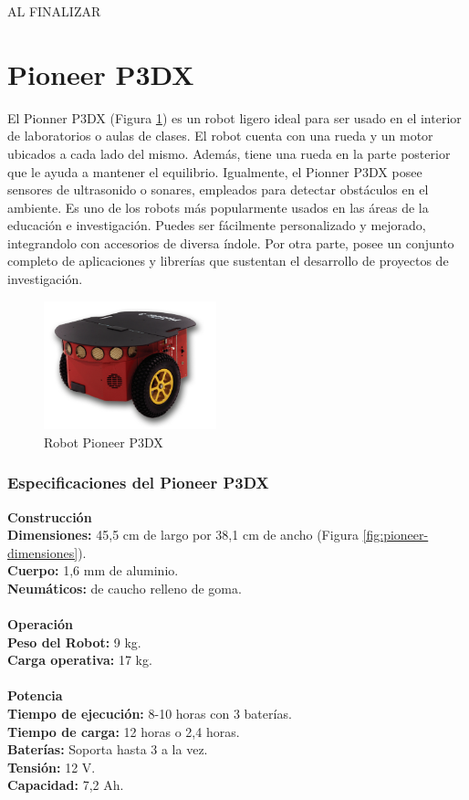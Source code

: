 \documentclass[11pt,twoside,A5]{article}
\newcommand{\reffigure}[1]{Figura \ref{#1}}
\newcommand{\refpfigure}[1]{(\reffigure{#1})}
\begin{document}
AL FINALIZAR

\section*{Pioneer P3DX}

El Pionner P3DX \refpfigure{fig:pioneer} es un robot ligero ideal para ser usado en el interior de laboratorios o aulas de clases. El robot cuenta con una rueda y un motor ubicados a cada lado del mismo. Además, tiene una rueda en la parte posterior que le ayuda a mantener el equilibrio.
Igualmente, el Pionner P3DX posee sensores de ultrasonido o sonares, empleados para detectar obstáculos en el ambiente.
Es uno de los robots más popularmente usados en las áreas de la educación e investigación. Puedes ser fácilmente personalizado y mejorado, integrandolo con accesorios de diversa índole. Por otra parte, posee un conjunto completo de aplicaciones y librerías que sustentan el desarrollo de proyectos de investigación.

\begin{figure}[here]
	\centering
	\includegraphics[width=5cm]{pioneer.png} 
	\caption{Robot Pioneer P3DX}
	\label{fig:pioneer}
\end{figure} 

\subsubsection*{Especificaciones del Pioneer P3DX}

\noindent\textbf{Construcción}
\\
\indent\textbf{Dimensiones:} 45,5 cm de largo por 38,1 cm de ancho \refpfigure{fig:pioneer-dimensiones}.
\\
\indent\textbf{Cuerpo:} 1,6 mm de aluminio.
\\
\indent\textbf{Neumáticos:} de caucho relleno de goma.
\\\\
\noindent\textbf{Operación}
\\
\indent\textbf{Peso del Robot:} 9 kg.
\\
\indent\textbf{Carga operativa:} 17 kg.
\\\\
\noindent\textbf{Potencia}
\\
\indent\textbf{Tiempo de ejecución:} 8-10 horas con 3 baterías.
\\
\indent\textbf{Tiempo de carga:} 12 horas o 2,4 horas.
\\
\indent\textbf{Baterías:} Soporta hasta 3 a la vez.
\\
\indent\textbf{Tensión:} 12 V.
\\
\indent\textbf{Capacidad:} 7,2 Ah.
\end{document}
